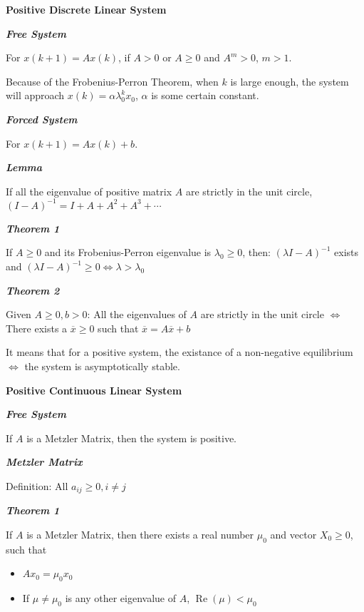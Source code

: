 \documentclass{article}
\newcommand{\bigtitle}[1]{
	\noindent
	\textbf{#1}
}
\newcommand{\smalltitle}[1]{
	\noindent
	\textbf{\textit{#1}}
}
\begin{document}
\begin{spacing}{1.2}
\bigtitle{Positive Discrete Linear System}

\smalltitle{Free System}

For $x(k+1)=A x(k)$, if $A>0$ or $A\geq 0$ and $A^m > 0$, $m>1$.

Because of the Frobenius-Perron Theorem, when $k$ is large enough, the system will approach $x(k)=\alpha \lambda_{0}^{k} x_{0}$, $\alpha$ is some certain constant.


\smalltitle{Forced System}

For $x(k+1)=A x(k)+b$.

\begin{comment}
If $\lambda > \lambda_0$ ($\lambda_{0}$ is the Frobenius-Perron eigenvalue), then $(\lambda I-A)^{-1} \geq 0$.
Recall that the equilibrium is $\overline{x}=(I-A)^{-1} b$, with $b\geq 0$, then the equilibrium is positive.
\end{comment}

\smalltitle{Lemma}

If all the eigenvalue of positive matrix $A$ are strictly in the unit circle, $(I-A)^{-1}=I+A+A^{2}+A^{3}+\cdots$

\smalltitle{Theorem 1}

If $A \geq 0$ and its Frobenius-Perron eigenvalue is $\lambda_{0} \geq 0$, then: $(\lambda I-A)^{-1}$ exists and $(\lambda I-A)^{-1} \geq 0 \Leftrightarrow \lambda>\lambda_{0}$ 


\smalltitle{Theorem 2}

Given $A \geq 0, b>0$: All the eigenvalues of $A$ are strictly in the unit circle $\Leftrightarrow$ There exists a $\overline{x} \geq 0$ such that $\overline{x}=A \overline{x}+b$



It means that for a positive system, the existance of a non-negative equilibrium $\Leftrightarrow$ the system is asymptotically stable.

\bigtitle{Positive Continuous Linear System}

\smalltitle{Free System}

If $A$ is a Metzler Matrix, then the system is positive.

\smalltitle{Metzler Matrix}

Definition: All $a_{ij} \geq 0, i \neq j$

\smalltitle{Theorem 1}

If $A$ is a Metzler Matrix, then there exists a real number $\mu_0$ and vector $X_0 \geq 0$, such that

\begin{itemize}
	\item $A x_{0}=\mu_{0} x_{0}$
	\item If $\mu \neq \mu_0$ is any other eigenvalue of $A$, $\operatorname{Re}(\mu) < \mu_0$
\end{itemize}


\end{spacing}
\end{document}

